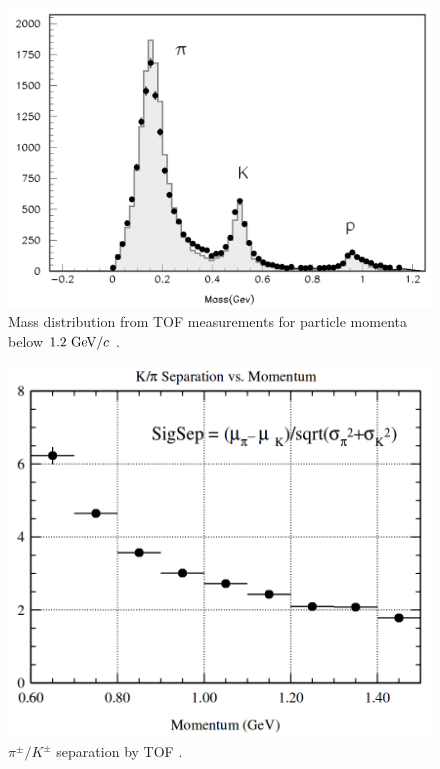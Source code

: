 \begin{figure}[H]
	\centering
	\captionsetup{width=0.8\linewidth}
	\includegraphics[width=0.6\linewidth]{fig/setup/TOF_mass}
	\caption{Mass distribution from TOF measurements for particle momenta below $1.2\mathrm{~GeV}/c$ \cite{ABASHIAN2002117}.}
	\label{fig:TOF_mass}
\end{figure}

\begin{figure}[H]
	\centering
	\captionsetup{width=0.8\linewidth}
	\includegraphics[width=0.6\linewidth]{fig/setup/TOF_separation}
	\caption{$\pi^\pm/K^\pm$ separation by TOF \cite{ABASHIAN2002117}.}
	\label{fig:TOF_separation}
\end{figure}



